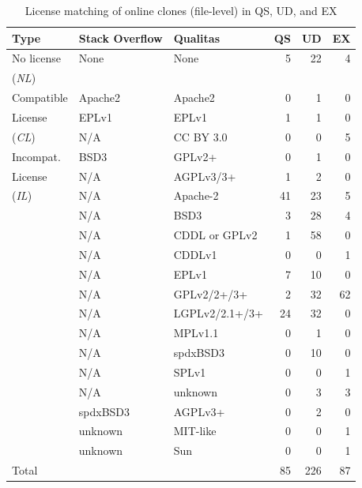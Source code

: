 \documentclass[sigconf,review, anonymous]{acmart}
\begin{document}
\begin{table}[]
	\centering
	\caption{License matching of online clones (file-level) in QS, UD, and EX}
	\label{tab:license_abc}
	\small
	\begin{tabular}{l|l|l|r|r|r}
		\hline
		Type & Stack Overflow & Qualitas & QS & UD & EX \\
		\hline
		No license & None & None &  5 & 22 & 4 \\
		(\textit{NL}) & & & & & \\
		\hline
		Compatible & Apache2 & Apache2 &  0 & 1 & 0 \\
		License	& EPLv1 & EPLv1 &  1 & 1 & 0 \\
		(\textit{CL}) & N/A & CC BY 3.0   &  0 & 0 & 5 \\
		\hline
	    Incompat. & BSD3 & GPLv2+ & 0 & 1 & 0 \\
		License	& N/A & AGPLv3/3+ & 1 & 2 & 0 \\
		(\textit{IL}) & N/A & Apache-2 & 41 & 23 & 5 \\
		& N/A & BSD3 & 3 & 28 & 4 \\
		& N/A & CDDL or GPLv2 & 1 & 58 & 0 \\
		& N/A & CDDLv1 & 0 & 0 & 1 \\
		& N/A & EPLv1 & 7 & 10 & 0 \\
		& N/A & GPLv2/2+/3+ & 2 & 32 & 62 \\
		& N/A & LGPLv2/2.1+/3+ & 24 & 32 & 0 \\
		& N/A & MPLv1.1 & 0 & 1 & 0 \\
		& N/A & spdxBSD3 & 0 & 10 & 0 \\
		& N/A & SPLv1 & 0 & 0 & 1 \\
		& N/A & unknown & 0 & 3 & 3 \\
		& spdxBSD3 & AGPLv3+ & 0 & 2 & 0 \\
		& unknown & MIT-like & 0 & 0 & 1 \\
		& unknown & Sun & 0 & 0 & 1 \\
		\hline
		\multicolumn{3}{l|}{Total} &  85 & 226 & 87 \\
		\hline
	\end{tabular} %
\end{table}
\end{document}
